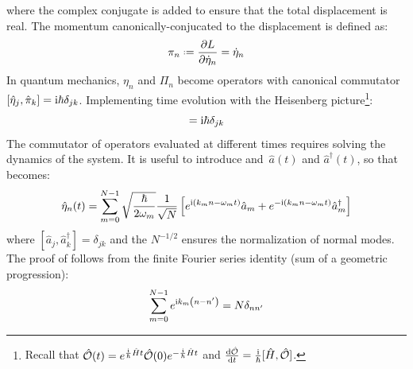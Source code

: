 where the complex conjugate is added to ensure that the total displacement is real. The momentum canonically-conjucated to the displacement is defined as:
\begin{equation}
  \pi_n \defeq \frac{\pa L}{\pa \dot{\eta}_n} = \dot{\eta}_n
\end{equation}
In quantum mechanics, $ \eta_n $ and $ \Pi_n $ become operators with canonical commutator $ [ \hat{\eta}_j, \hat{\pi}_k ] = \mathrm{i} \hbar \delta_{jk} $. Implementing time evolution with the Heisenberg picture\footnote{Recall that $ \hat{\mathcal{O}}(t) = e^{\frac{\mathrm{i}}{\hbar} \hat{H} t} \hat{\mathcal{O}}(0) e^{-\frac{\mathrm{i}}{\hbar} \hat{H} t} $ and $ \frac{\mathrm{d} \hat{\mathcal{O}}}{\mathrm{d} t} = \frac{\mathrm{i}}{\hbar} [ \hat{H}, \hat{\mathcal{O}} ] $.}:
\begin{equation}
  [ \hat{\eta}_j(t), \hat{\pi}_k(t) ] = \img \hbar \delta_{jk}
  \label{eq:first-comm}
\end{equation}
The commutator of operators evaluated at different times requires solving the dynamics of the system. It is useful to introduce  and \footnotemark $\, \hat{a}(t) $ and $ \hat{a}^\dagger(t) $, so that  becomes:
%
%
\begin{equation}
  \hat{\eta}_n(t) = \sum_{m = 0}^{N - 1} \sqrt{\frac{\hbar}{2 \omega_m}} \frac{1}{\sqrt{N}} \left[ e^{\mathrm{i} \left( k_m n - \omega_m t \right)} \hat{a}_m + e^{-\mathrm{i} \left( k_m n - \omega_m t \right)} \hat{a}_m^\dagger \right]
  \label{eq:first-quant}
\end{equation}
where $ [ \hat{a}_j, \hat{a}_k^\dagger ] = \delta_{jk} $ and the $ N^{-1/2} $ ensures the normalization of normal modes. The proof of  follows from the finite Fourier series identity (sum of a geometric progression):
\begin{equation}
  \sum_{m = 0}^{N - 1} e^{\mathrm{i} k_m \left( n - n' \right)} = N \delta_{n n'}
  \label{eq:first-id}
\end{equation}

